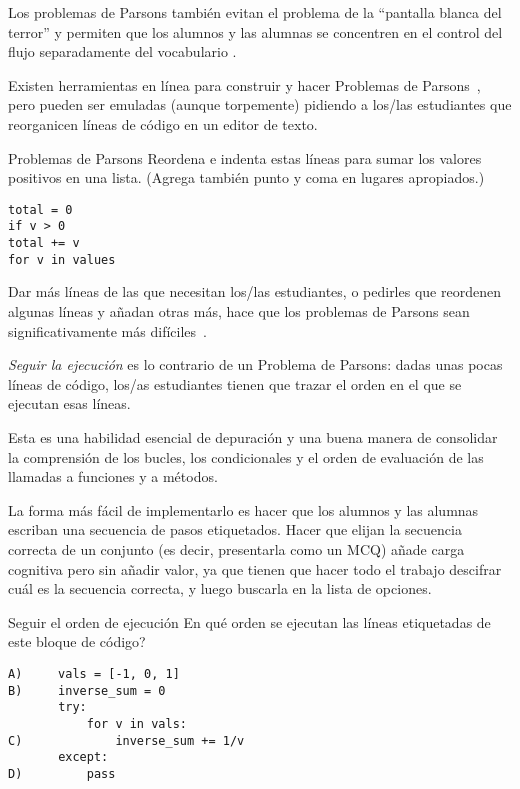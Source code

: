 Los problemas de Parsons  también evitan el problema de la ``pantalla blanca del terror'' y permiten que los alumnos y las alumnas se concentren en el control del flujo separadamente del vocabulario \cite{Pars2006,Eric2015,Morr2016,Eric2017}.

Existen herramientas  en línea para construir y hacer Problemas de Parsons~\cite{Ihan2011},
pero pueden ser emuladas (aunque torpemente) 
pidiendo a los/las estudiantes que reorganicen líneas de código en un editor de texto.

\begin{aside}{Problemas de Parsons}
  Reordena e indenta estas líneas para sumar los valores positivos en una lista.
  (Agrega también punto y coma en lugares apropiados.)

\begin{verbatim}
total = 0
if v > 0
total += v
for v in values
\end{verbatim}
\end{aside}

Dar más líneas de las que necesitan los/las estudiantes, o pedirles que reordenen algunas líneas y añadan otras más, hace que los problemas de Parsons sean significativamente más difíciles~\cite{Harm2016}.

\emph{Seguir la ejecución} es lo contrario de un Problema de Parsons: 
dadas unas pocas líneas de código, 
los/as estudiantes tienen que trazar el orden en el que se ejecutan esas líneas.


Esta es una habilidad esencial de depuración
 y una buena manera de consolidar la comprensión de los bucles, los condicionales y el orden de evaluación de las llamadas a funciones y a métodos.

La forma más fácil de implementarlo es hacer que los alumnos y las alumnas escriban una secuencia de pasos etiquetados.
Hacer que elijan la secuencia correcta de un conjunto 
(es decir, presentarla como un MCQ) 
añade carga cognitiva pero sin añadir valor, 
ya que tienen que hacer todo el trabajo descifrar cuál es la secuencia correcta, y luego buscarla en la lista de opciones.

\begin{aside}{Seguir el orden de ejecución}
  En qué orden se ejecutan las líneas etiquetadas de este bloque de código?

\begin{verbatim}
A)     vals = [-1, 0, 1]
B)     inverse_sum = 0
       try:
           for v in vals:
C)             inverse_sum += 1/v
       except:
D)         pass
\end{verbatim}
\end{aside}

